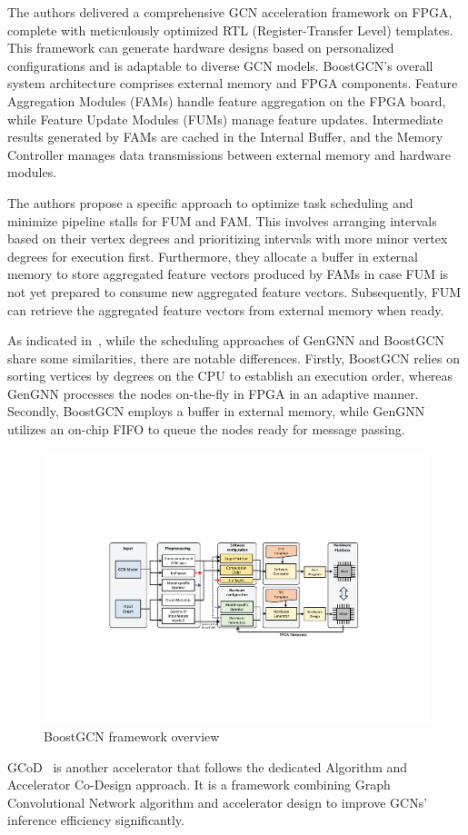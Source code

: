 The authors delivered a comprehensive GCN acceleration framework on FPGA, complete with meticulously optimized RTL (Register-Transfer Level) templates.
This framework can generate hardware designs based on personalized configurations and is adaptable to diverse GCN models.
BoostGCN's overall system architecture comprises external memory and FPGA components.
Feature Aggregation Modules (FAMs) handle feature aggregation on the FPGA board, while Feature Update Modules (FUMs) manage feature updates.
Intermediate results generated by FAMs are cached in the Internal Buffer, and the Memory Controller manages data transmissions between external memory and hardware modules.

The authors propose a specific approach to optimize task scheduling and minimize pipeline stalls for FUM and FAM. This involves arranging intervals based on their vertex degrees and prioritizing intervals with more minor vertex degrees for execution first.
Furthermore, they allocate a buffer in external memory to store aggregated feature vectors produced by FAMs in case FUM is not yet prepared to consume new aggregated feature vectors.
Subsequently, FUM can retrieve the aggregated feature vectors from external memory when ready.

As indicated in~\cite{DBLP:journals/corr/abs-2201-08475}, while the scheduling approaches of GenGNN and BoostGCN share some similarities, there are notable differences.
Firstly, BoostGCN relies on sorting vertices by degrees on the CPU to establish an execution order, whereas GenGNN processes the nodes on-the-fly in FPGA in an adaptive manner.
Secondly, BoostGCN employs a buffer in external memory, while GenGNN utilizes an on-chip FIFO to queue the nodes ready for message passing.

\begin{figure}[t]
    \centering
    \includegraphics[height=0.26\textwidth]{Images/BoostGCN_Framework}
    \caption{BoostGCN framework overview~\cite{9444065}}
    \label{fig:boost-gcn-framework}
\end{figure}

GCoD~\cite{9773223} is another accelerator that follows the dedicated Algorithm and Accelerator Co-Design approach.
It is a framework combining Graph Convolutional Network algorithm and accelerator design to improve GCNs' inference efficiency significantly.

